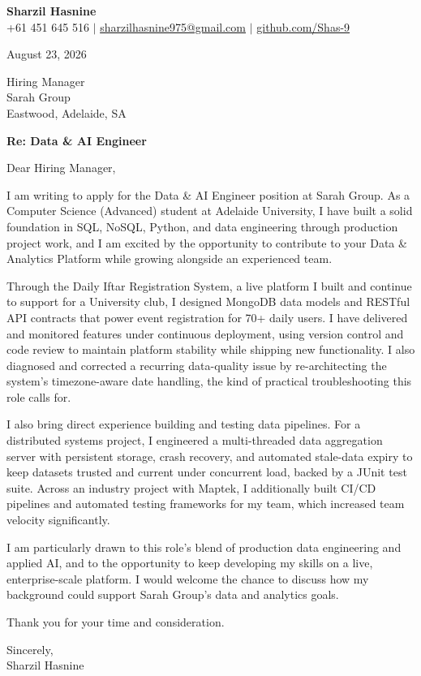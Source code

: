 \documentclass[letterpaper,11pt]{article}
\begin{document}
\begin{center}
    \textbf{\Large Sharzil Hasnine} \\ \vspace{3pt}
    \small +61 451 645 516 $|$ \href{mailto:sharzilhasnine975@gmail.com}{sharzilhasnine975@gmail.com} $|$
    \href{https://github.com/Shas-9}{github.com/Shas-9}
\end{center}

\vspace{10pt}

August 23, 2026

Hiring Manager \\
Sarah Group \\
Eastwood, Adelaide, SA

\vspace{5pt}

\textbf{Re: Data \& AI Engineer}

Dear Hiring Manager,

I am writing to apply for the Data \& AI Engineer position at Sarah Group. As a Computer Science (Advanced) 
student at Adelaide University, I have built a solid foundation in SQL, NoSQL, Python, and data engineering through
 production project work, and I am excited by the opportunity to contribute to your Data \& Analytics Platform
 while growing alongside an experienced team.

Through the Daily Iftar Registration System, a live platform I built and continue to support for a University
club, I designed MongoDB data models and RESTful API contracts that power event registration for 70+ 
daily users. I have delivered and monitored features under continuous deployment, using version control and 
code review to maintain platform stability while shipping new functionality. I also diagnosed and corrected 
a recurring data-quality issue by re-architecting the system's timezone-aware date handling, the kind of 
practical troubleshooting this role calls for.

I also bring direct experience building and testing data pipelines. For a distributed systems project, I 
engineered a multi-threaded data aggregation server with persistent storage, crash recovery, and automated 
stale-data expiry to keep datasets trusted and current under concurrent load, backed by a JUnit test suite.  
Across an industry project with Maptek, I additionally built CI/CD pipelines and automated testing frameworks 
for my team, which increased team velocity significantly.

I am particularly drawn to this role's blend of production data engineering and applied AI, and to the 
opportunity to keep developing my skills on a live, enterprise-scale platform. I would welcome the chance 
to discuss how my background could support Sarah Group's data and analytics goals.

Thank you for your time and consideration.

\vspace{10pt}

Sincerely, \\
Sharzil Hasnine
\end{document}
